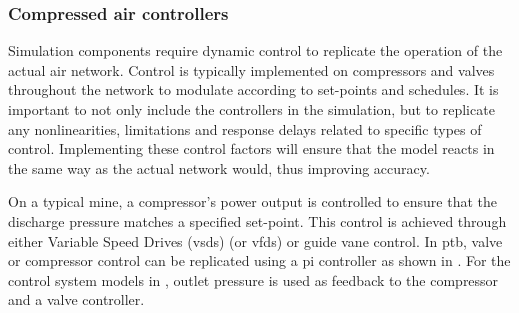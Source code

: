 		\subsubsection{Compressed air controllers}\label{Controllers}
			Simulation components require dynamic control to replicate the operation of the actual air network. Control is typically implemented on compressors and valves throughout the network to modulate according to set-points and schedules. It is important to not only include the controllers in the simulation, but to replicate any nonlinearities, limitations and response delays related to specific types of control. Implementing these control factors will ensure that the model reacts in the same way as the actual network would, thus improving accuracy.
			\par 
			On a typical mine, a compressor's power output is controlled to ensure that the discharge pressure matches a specified  set-point. This control is achieved through either Variable Speed Drives (\glspl{vsd}) (or \glspl{vfd}) or guide vane control. In \gls{ptb}, valve or compressor control can be replicated using a \gls{pi} controller as shown in . For the control system models in , outlet pressure is used as feedback to the compressor and a valve controller. 
			\par 
			
